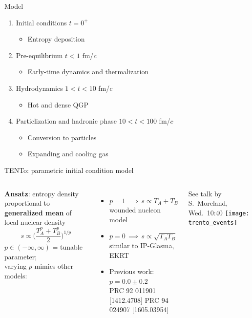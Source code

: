 \documentclass{beamer}
\newcommand{\trento}{T\raisebox{-.5ex}{R}ENTo}
\begin{document}
\begin{frame}[t]{Model}
  \eventframes{{,,,,,,}}
  \medskip
  \begin{enumerate}
    \item Initial conditions \hfill $t = 0^+$ \\
      \begin{itemize}
        \item Entropy deposition
      \end{itemize}
    \item Pre-equilibrium \hfill $t < 1$ fm/$c$
      \begin{itemize}
        \item Early-time dynamics and thermalization
      \end{itemize}
    \item Hydrodynamics \hfill $1 < t < 10$ fm/$c$
      \begin{itemize}
        \item Hot and dense QGP
      \end{itemize}
    \item Particlization and hadronic phase \hfill $10 < t < 100$ fm/$c$
      \begin{itemize}
        \item Conversion to particles
        \item Expanding and cooling gas
      \end{itemize}
  \end{enumerate}
\end{frame}

\begin{frame}{\trento: parametric initial condition model}
  \begin{columns}
    \textbf{Ansatz}: entropy density proportional to \textbf{generalized mean} of local nuclear density
    \begin{equation*}
      s \propto \biggl( \frac{T_A^p + T_B^p}{2} \biggr)^{1/p}
    \end{equation*}
    $p \in (-\infty, \infty)$ = tunable parameter; \\
    varying $p$ mimics other models:
    \begin{itemize}
      \item $p = 1 \,\implies\, s \propto T_A + T_B$ \\
        wounded nucleon model
      \item $p = 0 \,\implies\, s \propto \sqrt{T_A T_B}$ \\
        similar to IP-Glasma, EKRT
      \item Previous work: $p = 0.0 \pm 0.2$ \\[1ex]
        \tiny
        PRC 92 011901 [1412.4708] \quad
        PRC 94 024907 [1605.03954]
    \end{itemize}
    \medskip
    \footnotesize
    See talk by S.~Moreland, Wed.~10:40
    \vspace{1em}
    \texttt{[image: trento\_events]}
  \end{columns}
\end{frame}
\end{document}
